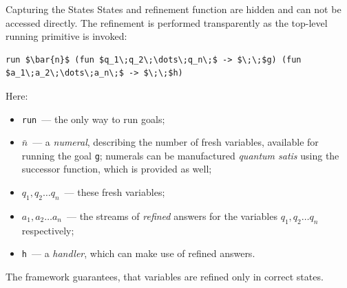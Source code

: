 \documentclass[10pt, mathserif]{beamer}
\theoremstyle{definition}
\begin{document}
%
%
%
%

\begin{frame}[fragile]{Capturing the States}
States and refinement function are hidden and can not be accessed directly.\pause
\vskip3mm
The refinement is performed transparently as the top-level running primitive
is invoked:\pause
\vskip3mm
\begin{lstlisting}[mathescape=true]
    run $\bar{n}$ (fun $q_1\;q_2\;\dots\;q_n\;$ -> $\;\;$g) (fun $a_1\;a_2\;\dots\;a_n\;$ -> $\;\;$h)
\end{lstlisting}\pause

Here:
{\small
\begin{itemize}
\item \lstinline{run}~--- the only way to run goals;
\item $\bar{n}$~--- a \emph{numeral}, describing the number of fresh variables,
available for running the goal \lstinline{g}; numerals can be manufactured
\emph{quantum satis} using the successor function, which is provided as well;
\item $q_1, q_2\dots q_n$~--- these fresh variables;
\item $a_1, a_2\dots a_n$~--- the streams of \emph{refined} answers for the variables
$q_1, q_2\dots q_n$ respectively;
\item \lstinline{h}~--- a \emph{handler}, which can make use of refined answers.
\end{itemize}
}

The framework guarantees, that variables are refined only in correct states.

\end{frame}
\end{document}
